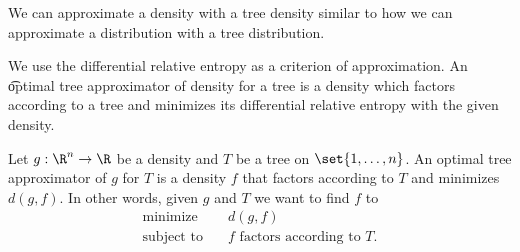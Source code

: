 




















\sstart
{}


We can approximate a density with a tree density similar to how we can approximate a distribution with a tree distribution.


We use the differential relative entropy as a criterion of approximation.
An \t{optimal tree approximator} of density for a tree is a density which factors according to a tree and minimizes its differential relative entropy with the given density.


Let $g: \R^n \to \R$ be a density and $T$ be a tree on $\set{1, \dots, n}$.
An optimal tree approximator of $g$ for $T$ is a density $f$ that factors according to $T$ and minimizes $d(g, f)$.
In other words, given $g$ and $T$ we want to find $f$ to
\[
  \begin{aligned}
    \text{minimize}   &\quad d(g, f) \\
    \text{subject to} &\quad f \text{ factors according to } T.
  \end{aligned}
\]


